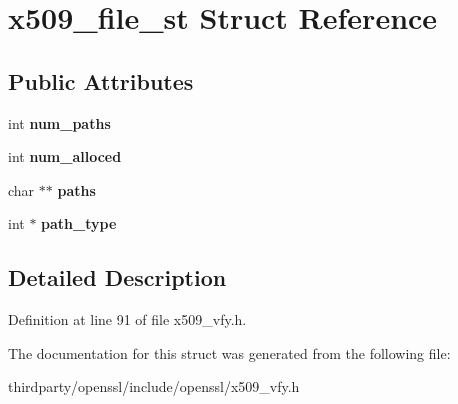 \hypertarget{structx509__file__st}{}\section{x509\+\_\+file\+\_\+st Struct Reference}
\label{structx509__file__st}
\subsection*{Public Attributes}
\begin{DoxyCompactItemize}
\item 
\mbox{\label{structx509__file__st_a625533740392eada26b9522bfc5f563f}} 
int {\bfseries num\+\_\+paths}
\item 
\mbox{\label{structx509__file__st_a74ca798c37b4f0c937d6392d1a06eb97}} 
int {\bfseries num\+\_\+alloced}
\item 
\mbox{\label{structx509__file__st_aa90fe6de68309d7572b7516787bf235f}} 
char $\ast$$\ast$ {\bfseries paths}
\item 
\mbox{\label{structx509__file__st_a2ecd2de35656eb382770bcb7317cb3f4}} 
int $\ast$ {\bfseries path\+\_\+type}
\end{DoxyCompactItemize}


\subsection{Detailed Description}


Definition at line 91 of file x509\+\_\+vfy.\+h.



The documentation for this struct was generated from the following file\+:\begin{DoxyCompactItemize}
\item 
thirdparty/openssl/include/openssl/x509\+\_\+vfy.\+h\end{DoxyCompactItemize}
